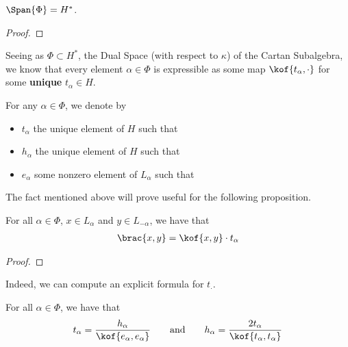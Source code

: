 \begin{boxcorollary}
    $\Span{\Phi} = H^*$.
\end{boxcorollary}
\begin{proof}
    \sorry
\end{proof}

Seeing as $\Phi \subset H^*$, the Dual Space (with respect to $\kappa$) of the Cartan Subalgebra, we know that every element $\alpha \in \Phi$ is expressible as some map $\kof{t_{\alpha}, \cdot}$ for some \textbf{unique} $t_{\alpha} \in H$.
\begin{boxconvention}
    For any $\alpha \in \Phi$, we denote by
    \begin{itemize}[noitemsep]
        \item $t_{\alpha}$ the unique element of $H$ such that 
        \item $h_{\alpha}$ the unique element of $H$ such that \sorry
        \item $e_{\alpha}$ some nonzero element of $L_{\alpha}$ such that 
    \end{itemize}
\end{boxconvention}

The fact mentioned above will prove useful for the following proposition.

\begin{boxproposition}
    For all $\alpha \in \Phi$, $x \in L_{\alpha}$ and $y \in L_{-\alpha}$, we have that
    \begin{align*}
        \brac{x, y} = \kof{x, y} \cdot t_{\alpha}
    \end{align*}
\end{boxproposition}
\begin{proof}
    \sorry
\end{proof}

Indeed, we can compute an explicit formula for $t_{\cdot}$.

\begin{boxproposition}
    For all $\alpha \in \Phi$, we have that
    \begin{align*}
        t_{\alpha} = \frac{h_{\alpha}}{\kof{e_{\alpha}, e_{\alpha}}}
        \qquad \text{and} \qquad 
        h_{\alpha} = \frac{2t_{\alpha}}{\kof{t_{\alpha}, t_{\alpha}}}
    \end{align*}
\end{boxproposition}

